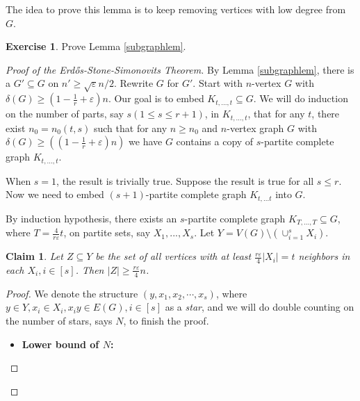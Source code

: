 \documentclass{article}
\newtheorem{claim}[theorem]{Claim}
\theoremstyle{definition}
\newtheorem{exercise}[theorem]{Exercise}
\def\Erdos{Erd\H{o}s}
\begin{document}
The idea to prove this lemma is to keep removing vertices with low degree from $G$.

\begin{exercise}
    Prove Lemma \ref{subgraphlem}.
\end{exercise}

\begin{proof}[Proof of the \Erdos{}-Stone-Simonovits Theorem]
    By Lemma \ref{subgraphlem}, there is a $G' \subseteq G$ on $n' \geq \sqrt{\varepsilon}n/2$. Rewrite $G$ for $G'$. Start with $n$-vertex $G$ with $\delta(G) \geq (1-\frac{1}{r}+\varepsilon)n$. Our goal is to embed $K_{t,...,t} \subseteq G$. We will do induction on the number of parts, say $s(1\leq s \leq r+1)$, in $K_{t,...,t}$, that for any $t$, there exist $n_0 = n_0(t,s)$ such that for any $n \geq n_0$ and $n$-vertex graph $G$ with $\delta(G) \geq ((1-\frac{1}{r}+\varepsilon)n)$ we have $G$ contains a copy of $s$-partite complete graph $K_{t,...,t}$. 

    When $s = 1$, the result is trivially true. Suppose the result is true for all $s \leq r$. Now we need to embed $(s+1)$-partite complete graph $K_{t,...t}$ into $G$. 

    By induction hypothesis, there exists an $s$-partite complete graph $K_{T,...,T} \subseteq G$, where $T = \frac{4}{r\varepsilon}t$, on partite sets, say $X_1,...,X_s$. Let $Y = V(G) \setminus (\cup_{i=1}^s X_i)$.

    \begin{claim}
        Let $Z \subseteq Y$ be the set of all vertices with at least $\frac{r\varepsilon}{4}|X_i| = t$ neighbors in each $X_i, i\in[s]$. Then $|Z| \geq \frac{r\varepsilon}{4}n$.
    \end{claim}

    \begin{proof}
        We denote the structure $(y,x_1,x_2,\cdots,x_s)$, where $y\in Y,x_i\in X_i,x_iy\in E(G),i\in [s]$ as a \emph{star}, and we will do double counting on the number of stars, says $N$, to finish the proof. 

        \begin{itemize}
            \item \textbf{Lower bound of $N$:}
            

\end{itemize}
\end{proof}
\end{proof}
\end{document}
